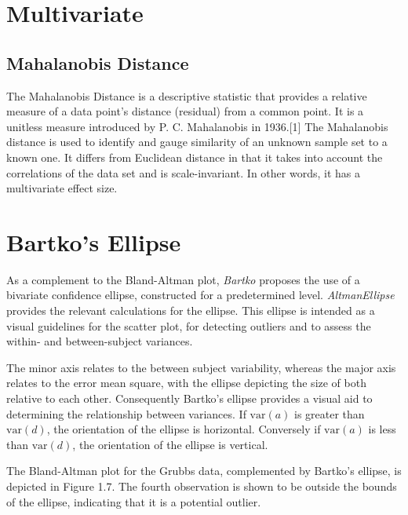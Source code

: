 \documentclass[Chap2bmain.tex]{subfiles}
\begin{document}
\newpage

\section{Multivariate}
\subsection{Mahalanobis Distance }

The Mahalanobis Distance is a descriptive statistic that provides a relative measure of a data point's distance (residual) from a common point. It is a unitless measure introduced by P. C. Mahalanobis in 1936.[1] The Mahalanobis distance is used to identify and gauge similarity of an unknown sample set to a known one. It differs from Euclidean distance in that it takes into account the correlations of the data set and is scale-invariant. In other words, it has a multivariate effect size.

\section{Bartko's Ellipse}
As a complement to the Bland-Altman plot, \textit{Bartko} proposes
the use of a bivariate confidence ellipse, constructed for a
predetermined level. \textit{AltmanEllipse} provides the relevant calculations for the
ellipse. This ellipse is intended as a visual
guidelines for the scatter plot, for detecting outliers and to
assess the within- and between-subject variances.

The minor axis relates to the between subject variability, whereas
the major axis relates to the error mean square, with the ellipse
depicting the size of both relative to each other.
Consequently Bartko's ellipse provides a visual aid to determining the
relationship between variances. If $\mbox{var}(a)$ is greater than $\mbox{var}(d)$, the orientation of the ellipse is horizontal. Conversely if $\mbox{var}(a)$ is less than $\mbox{var}(d)$, the orientation of the ellipse is vertical.



The Bland-Altman plot for the Grubbs data, complemented by Bartko's ellipse, is depicted in Figure 1.7.
The fourth observation is shown to be outside the bounds of the ellipse, indicating that it is a potential outlier.


\end{document}
